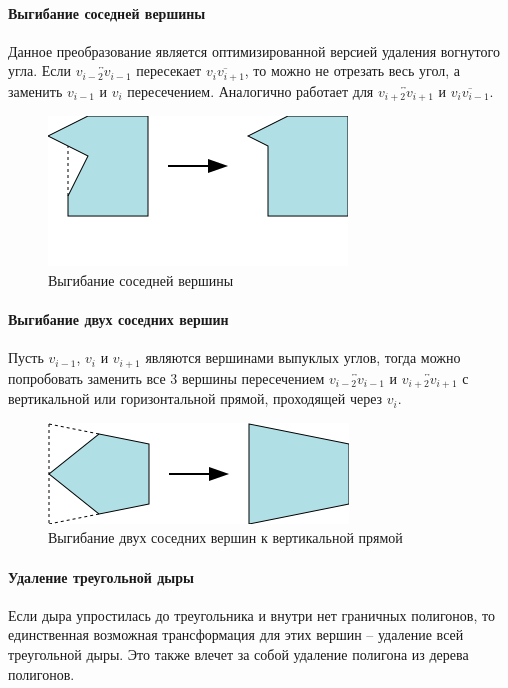 \documentclass{fefu_thesis/cls/fefu}
\newcommand*\gsegment[1]{\overline{#1}}
\newcommand*\gline[1]{\overleftrightarrow{#1}}
\begin{document}
    \paragraph{Выгибание соседней вершины}
    Данное преобразование является оптимизированной версией удаления вогнутого угла. Если $\gline{v_{i - 2}v_{i - 1}}$ пересекает $\gsegment{v_iv_{i + 1}}$, то можно не отрезать весь угол, а заменить $v_{i - 1}$ и $v_{i}$ пересечением. Аналогично работает для $\gline{v_{i + 2}v_{i + 1}}$ и $\gsegment{v_iv_{i - 1}}$.

    \begin{figure}[H]
        \centering
        \includegraphics[scale=1]{images/bendneighbor.png}
        \caption{Выгибание соседней вершины}
    \end{figure}

    \paragraph{Выгибание двух соседних вершин}
    Пусть $v_{i - 1}$, $v_{i}$ и $v_{i + 1}$ являются вершинами выпуклых углов, тогда можно попробовать заменить все 3 вершины пересечением $\gline{v_{i - 2}v_{i - 1}}$ и $\gline{v_{i + 2}v_{i + 1}}$ с вертикальной или горизонтальной прямой, проходящей через $v_i$.
    \begin{figure}[H]
        \centering
        \includegraphics[scale=1]{images/bendoutboth.png}
        \caption{Выгибание двух соседних вершин к вертикальной прямой}
    \end{figure}
    \paragraph{Удаление треугольной дыры}
    Если дыра упростилась до треугольника и внутри нет граничных полигонов, то единственная возможная трансформация для этих вершин -- удаление всей треугольной дыры. Это также влечет за собой удаление полигона из дерева полигонов.
\end{document}
